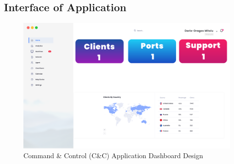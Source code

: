 \newpage

\subsection{Interface of Application}

\begin{figure}[h]
    \centering
    \includegraphics[width=1.0\textwidth]{images/command-control-dashboard.pdf}
    \captionsetup{justification=centering}
    \caption[Command \& Control Dashboard Design]{Command \& Control (C\&C) Application Dashboard Design}
    \label{fig:command-dashboard}
\end{figure}

